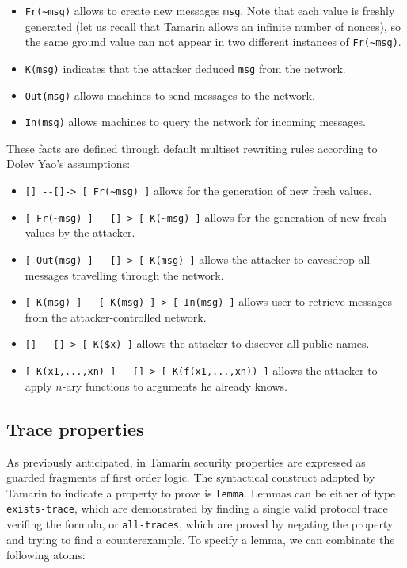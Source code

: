 \documentclass[fleqn,10pt]{SelfArx} %
\begin{document}
\begin{itemize}
    \item \lstinline|Fr(~msg)| allows to create new messages \lstinline|msg|. Note that each value is freshly generated (let us recall that Tamarin allows an infinite number of nonces), so the same ground value can not appear in two different instances of \lstinline|Fr(~msg)|.
    \item \lstinline|K(msg)| indicates that the attacker deduced \lstinline|msg| from the network.
    \item \lstinline|Out(msg)| allows machines to send messages to the network.
    \item \lstinline|In(msg)| allows machines to query the network for incoming messages.
\end{itemize}

These facts are defined through default multiset rewriting rules according to Dolev Yao's assumptions:

\begin{itemize}
    \item \lstinline|[] --[]-> [ Fr(~msg) ]| allows for the generation of new fresh values.
    \item \lstinline|[ Fr(~msg) ] --[]-> [ K(~msg) ]| allows for the generation of new fresh values by the attacker.
    \item \lstinline|[ Out(msg) ] --[]-> [ K(msg) ]| allows the attacker to eavesdrop all messages travelling through the network. 
    \item \lstinline|[ K(msg) ] --[ K(msg) ]-> [ In(msg) ]| allows user to retrieve messages from the attacker-controlled network.
    \item \lstinline|[] --[]-> [ K($x) ]| allows the attacker to discover all public names.
    \item \lstinline|[ K(x1,...,xn) ] --[]-> [ K(f(x1,...,xn)) ]| allows the attacker to apply $n$-ary functions to arguments he already knows.
\end{itemize}

\subsection{Trace properties}\label{subsec:TraceProperties}

As previously anticipated, in Tamarin security properties are expressed as guarded fragments of first order logic. The syntactical construct adopted by Tamarin to indicate a property to prove is \lstinline|lemma|. Lemmas can be either of type \lstinline|exists-trace|, which are demonstrated by finding a single valid protocol trace verifing the formula, or \lstinline|all-traces|, which are proved by negating the property and trying to find a counterexample. To specify a lemma, we can combinate the following atoms:
\end{document}
